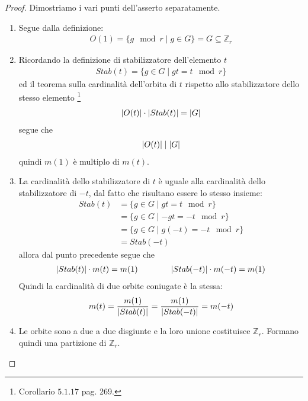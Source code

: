 \begin{proof}
Dimostriamo i vari punti dell'asserto separatamente.
\begin{enumerate}
   \item Segue dalla definizione:
         \begin{align*}
            O(1) = \lbrace g \mod{r} \mid g \in G \rbrace = G \subseteq  \mathbb{Z}_{r}
         \end{align*}
    \item Ricordando la definizione di stabilizzatore dell'elemento $t$
          \begin{align*}
            Stab(t) = \lbrace g \in G \mid gt = t \mod r \rbrace
          \end{align*}
          ed il teorema sulla cardinalità dell'orbita di $t$ rispetto allo stabilizzatore dello stesso elemento
          \footnote{ \cite{cattaneo} Corollario $5.1.17$ pag. 269.}
          \begin{align*}
            \arrowvert O(t)\arrowvert \cdot \arrowvert Stab(t) \arrowvert = \arrowvert G \arrowvert
          \end{align*}
          segue che
          \begin{align*}
            \arrowvert O(t)\arrowvert \mid \arrowvert G \arrowvert
          \end{align*}
          quindi $m(1)$ è multiplo di $m(t)$.
    \item La cardinalità dello stabilizzatore di $t$ è uguale alla cardinalità dello stabilizzatore
          di $-t$, dal fatto che risultano essere lo stesso insieme:
          \begin{align*}
            Stab(t) &= \lbrace g \in G \mid gt = t \mod r \rbrace   \\
                    &= \lbrace g \in G \mid -gt = -t \mod r \rbrace \\
                    &= \lbrace g \in G \mid g(-t) = -t \mod r \rbrace \\
                    &= Stab(-t)
          \end{align*}
          allora dal punto precedente segue che
          \begin{align*}
            \arrowvert Stab(t)\arrowvert \cdot m(t) = m(1)
            \qquad \qquad
            \arrowvert Stab(-t)\arrowvert \cdot m(-t) = m(1)
          \end{align*}
          Quindi la cardinalità di due orbite coniugate è la stessa:
          \begin{align*}
            m(t) = \frac{m(1)}{\arrowvert Stab(t)\arrowvert}
            = \frac{m(1)}{\arrowvert Stab(-t)\arrowvert} = m(-t)
          \end{align*}
      \item Le orbite sono a due a due disgiunte e la loro unione costituisce $\mathbb{Z}_{r}$. Formano quindi una partizione di $\mathbb{Z}_{r}$.
\end{enumerate}
\end{proof}

